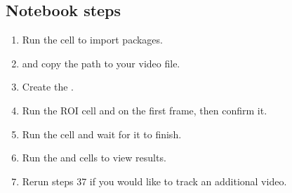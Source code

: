 \documentclass[letterpaper,10pt,english]{jupyterBook}
\begin{document}
\subsection{Notebook steps}
\label{\detokenize{FlyTracking/ColabNotebook:notebook-steps}}\begin{enumerate}
%
\item {} 
\sphinxAtStartPar
Run the  cell to import packages.

\item {} 
\sphinxAtStartPar
{} and copy the path to your video file.

\item {} 
\sphinxAtStartPar
Create the .

\item {} 
\sphinxAtStartPar
Run the ROI cell and  on the first frame, then confirm it.

\item {} 
\sphinxAtStartPar
Run the  cell and wait for it to finish.

\item {} 
\sphinxAtStartPar
Run the  and  cells to view results.

\item {} 
\sphinxAtStartPar
Re\sphinxhyphen{}run steps 3\sphinxhyphen{}7 if you would like to track an additional video.

\end{enumerate}
\end{document}
